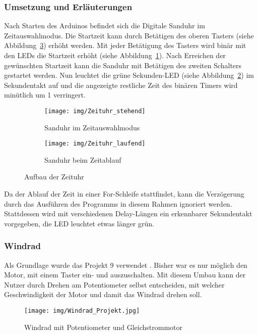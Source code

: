 \subsubsection{Umsetzung und Erläuterungen}
Nach Starten des Arduinos befindet sich die Digitale Sanduhr im Zeitauswahlmodus. Die Startzeit kann durch Betätigen des oberen Tasters (siehe Abbildung~\ref{Zeituhr}) erhöht werden. Mit jeder Betätigung des Tasters wird binär mit den LEDs die Startzeit erhöht (siehe Abbildung~\ref{stehend}). Nach Erreichen der gewünschten Startzeit kann die Sanduhr mit Betätigen des zweiten Schalters gestartet werden. Nun leuchtet die grüne Sekunden-LED (siehe Abbildung~\ref{laufend}) im Sekundentakt auf und die angezeigte restliche Zeit des binären Timers wird minütlich um 1 verringert.\\

\begin{figure}[h]
	\centering
	\begin{subfigure}[b]{0.48\linewidth}
		\centering
		\texttt{[image: img/Zeituhr\_stehend]}
		\caption{Sanduhr im Zeitauswahlmodus}\label{stehend}
	\end{subfigure}\enspace%
	\begin{subfigure}[b]{0.48\linewidth}
		\centering
		\texttt{[image: img/Zeituhr\_laufend]}
		\caption{Sanduhr beim Zeitablauf}\label{laufend}
	\end{subfigure}
	\caption{Aufbau der Zeituhr}\label{Zeituhr}
\end{figure}

Da der Ablauf der Zeit in einer For-Schleife stattfindet, kann die Verzögerung durch das Ausführen des Programms in diesem Rahmen ignoriert werden. Stattdessen wird mit verschiedenen Delay-Längen ein erkennbarer Sekundentakt vorgegeben, die LED leuchtet etwas länger grün. 

\subsubsection{Windrad}

 Als Grundlage wurde das Projekt 9 verwendet \autocite{arduino}. Bisher war es nur möglich den Motor, mit einem Taster ein- und auszuschalten. Mit diesem Umbau kann der Nutzer durch Drehen am Potentiometer selbst entscheiden, mit welcher Geschwindigkeit der Motor und damit das Windrad drehen soll.
\\

\begin{figure}[h]
\begin{center}
\texttt{[image: img/Windrad\_Projekt.jpg]}
\caption{Windrad mit Potentiometer und Gleichstrommotor}
\label{Windrad_project}
\end{center}
\end{figure}

